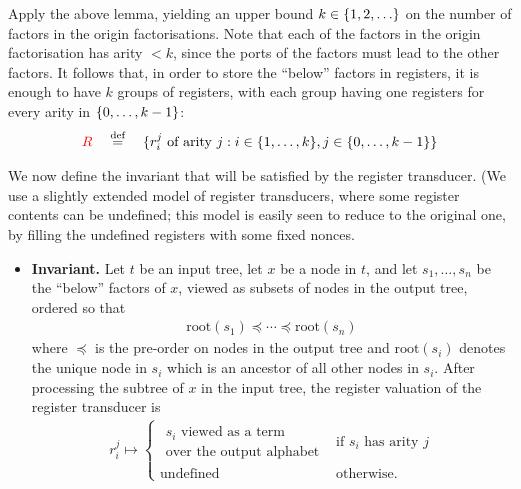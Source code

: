 Apply the above lemma, yielding an upper bound  $k \in \{1,2,\ldots\}$ on the number of factors in the origin factorisations.
Note that each of the factors in the origin factorisation has arity  $<k$, since the ports of the factors must lead to the other factors. It follows that, in order to store the ``below'' factors in registers, it is enough to have  $k$ groups of registers, with each group having one registers for every arity in $\{0,\ldots,k-1\}$:
\newcommand{\sttregval}[2]{\text{{(register valuation of $#1$ in $#2$)}}}
\newcommand{\rootnode}[1]{\mathrm{root}(#1)}
\begin{align*}
{{\color{red}{R}}} \quad \stackrel{\text{def}}= \quad \{r_i^j \text{ of arity $j$} : i \in \{1,\ldots,k\}, j \in \{0,\ldots,k-1\}\} 
\end{align*}

We now define the invariant that will be satisfied by the register transducer. (We use a slightly extended model of register transducers, where some register contents can be undefined; this model is easily seen to reduce to the original one, by filling the undefined registers with  some fixed nonces. 
\begin{itemize}
    \item {\bf Invariant.} Let $t$ be an input tree,  let $x$ be a node in $t$, and let $s_1,\ldots,s_n$ be the ``below'' factors of $x$, viewed as subsets of nodes in the output tree, ordered so that 
    \begin{align*}
       \rootnode{s_1} \preceq  \cdots \preceq \rootnode{s_n} 
    \end{align*}
    where $\preceq$ is the pre-order on nodes in the output tree and $\rootnode{s_i}$ denotes the  unique node in $s_i$ which is an ancestor of all other nodes in $s_i$. After processing the subtree of $x$ in the input tree, the register valuation of the register transducer is 
    \begin{align*}
        r_i^j  \mapsto \begin{cases}
            \begin{array}{l}
            \text{$s_i$ viewed as a term} \\[-2pt] \text{over the output alphabet}
            \end{array} & \text{if $s_i$ has arity $j$}\\[10pt]
            \text{undefined} & \text{otherwise}.
        \end{cases}
    \end{align*}
\end{itemize}


